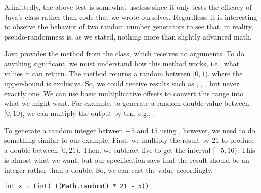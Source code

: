 Admittedly, the above test is somewhat useless since it only tests the efficacy of Java's  class rather than code that we wrote ourselves. Regardless, it is interesting to observe the behavior of two random number generators to see that, in reality, pseudo-randomness is, as we stated, nothing more than slightly advanced math.

\example Java provides the  method from the  class, which receives no arguments. To do anything significant, we must understand how this method works, i.e., what values it can return. The  method returns a random  between $[0, 1)$, where the upper-bound is exclusive. So, we could receive results such as , , , but never exactly one. We can use basic multiplicative offsets to convert this range into what we might want. For example, to generate a random double value between $[0, 10)$, we can multiply the output by ten, e.g., .

\example To generate a random integer between $-5$ and $15$ using , however, we need to do something similar to our  example. First, we multiply the result by $21$ to produce a double between $[0, 21)$. Then, we subtract five to get the interval $[-5, 16)$. This is almost what we want, but our specification says that the result should be an integer rather than a double. So, we can cast the value accordingly.

\begin{verbatim}
int x = (int) ((Math.random() * 21 - 5))
\end{verbatim}